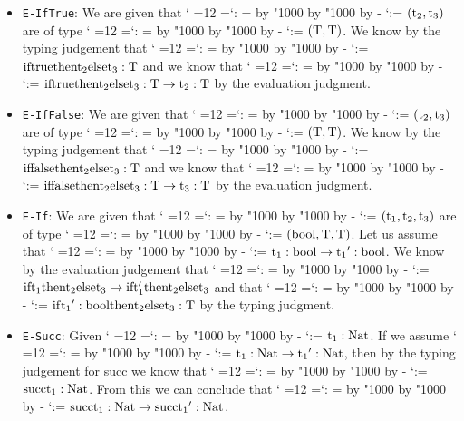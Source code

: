 \documentclass[12pt,letterpaper]{article}
\makeatletter
\newenvironment{lambdac}
  {\catcode` =12 \setupspace
   \makeordinary{:}%
   $\mathgroup0 }
  {$}
{\catcode` =\active\gdef\setupspace{\def {\;}}}
\newcommand{\makeordinary}[1]{\@tempcnta=\mathcode`#1
  \@tempcntb=\@tempcnta
  \divide\@tempcntb by "1000
  \multiply\@tempcntb by "1000
  \advance\@tempcnta by -\@tempcntb
  \mathcode`#1=\@tempcnta}
\makeatother
\begin{document}
\begin{itemize}
\item {\tt E-IfTrue}: We are given that \begin{lambdac}(t_2, t_3)\end{lambdac} are of type \begin{lambdac}(T, T)\end{lambdac}. We know by the typing judgement that \begin{lambdac}if true then t_2 else t_3 : T\end{lambdac} and we know that \begin{lambdac}if true then t_2 else t_3 : T \rightarrow t_2 : T\end{lambdac} by the evaluation judgment.  

\item {\tt E-IfFalse}: We are given that \begin{lambdac}(t_2, t_3)\end{lambdac} are of type \begin{lambdac}(T, T)\end{lambdac}.  We know by the typing judgement that \begin{lambdac}if false then t_2 else t_3 : T\end{lambdac} and we know that \begin{lambdac}if false then t_2 else t_3 : T \rightarrow t_3 : T\end{lambdac} by the evaluation judgment.  

\item {\tt E-If}: We are given that \begin{lambdac}(t_1, t_2, t_3)\end{lambdac} are of type \begin{lambdac}(bool, T, T)\end{lambdac}.  Let us assume that \begin{lambdac}t_1 : bool \rightarrow {t_1}' : bool\end{lambdac}. We know by the evaluation judgement that \begin{lambdac}if t_1 then t_2 else t_3 \rightarrow if t_1' then t_2 else t_3 \end{lambdac} and that \begin{lambdac}if {t_1}' : bool then t_2 else t_3 : T\end{lambdac} by the typing judgment.  

\item {\tt E-Succ}:  Given \begin{lambdac}t_1 : Nat\end{lambdac}.  If we assume \begin{lambdac}t_1 : Nat \rightarrow {t_1}' : Nat\end{lambdac}, then by the typing judgement for succ we know that \begin{lambdac}succ t_1 : Nat\end{lambdac}.  From this we can conclude that \begin{lambdac}succ t_1 : Nat \rightarrow succ {t_1}' : Nat\end{lambdac}.


\end{itemize}
\end{document}
